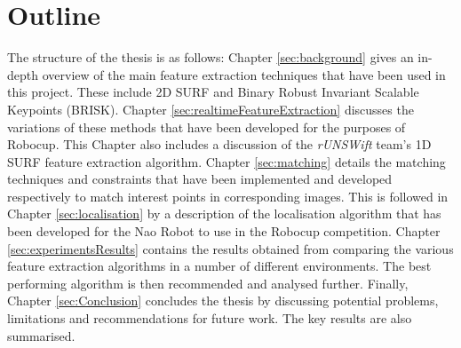\section{Outline}
\label{sec:outline}
The structure of the thesis is as follows: Chapter \ref{sec:background} gives an in-depth overview of the main feature extraction techniques that have been used in this project. These include 2D SURF and Binary Robust Invariant Scalable Keypoints (BRISK). Chapter \ref{sec:realtimeFeatureExtraction} discusses the variations of these methods that have been developed for the purposes of Robocup. This Chapter also includes a discussion of the \textit{rUNSWift} team's 1D SURF feature extraction algorithm. Chapter \ref{sec:matching} details the matching techniques and constraints that have been implemented and developed respectively to match interest points in corresponding images. This is followed in Chapter \ref{sec:localisation} by a description of the localisation algorithm that has been developed for the Nao Robot to use in the Robocup competition. Chapter \ref{sec:experimentsResults} contains the results obtained from comparing the various feature extraction algorithms in a number of different environments. The best performing algorithm is then recommended and analysed further. Finally, Chapter \ref{sec:Conclusion} concludes the thesis by discussing potential problems, limitations and recommendations for future work. The key results are also summarised.\\